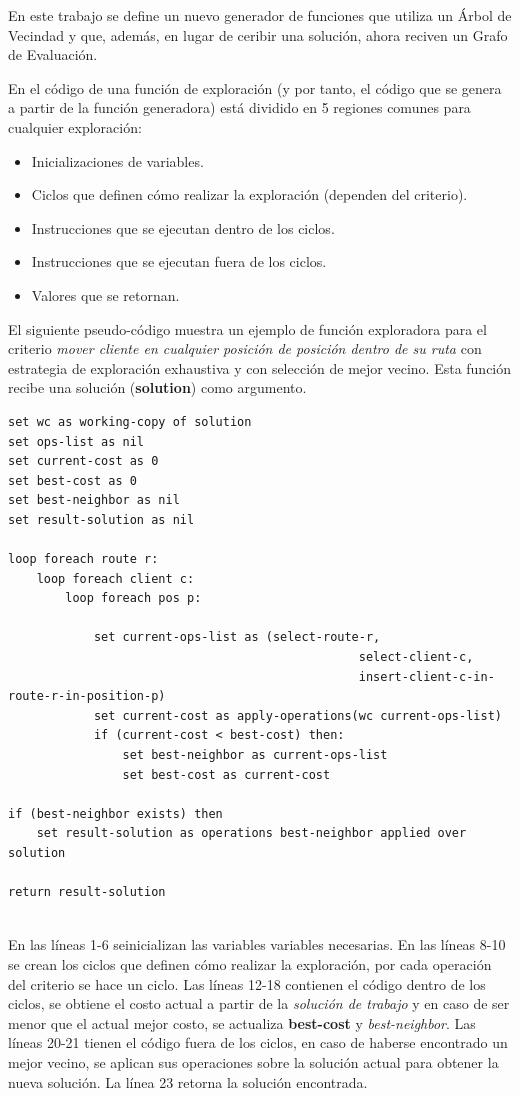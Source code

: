En este trabajo se define un nuevo generador de funciones que utiliza un Árbol de Vecindad y que, además, en lugar de ceribir una solución, ahora reciven un Grafo de Evaluación.

En \cite{Heidy} el código de una función de exploración (y por tanto, el código que se genera a partir de la función generadora) está dividido en 5 regiones comunes para cualquier exploración:

\begin{itemize}
	\item Inicializaciones de variables.
	\item Ciclos que definen cómo realizar la exploración (dependen del criterio).
	\item Instrucciones que se ejecutan dentro de los ciclos.
	\item Instrucciones que se ejecutan fuera de los ciclos.
	\item Valores que se retornan.
\end{itemize}

El siguiente pseudo-código muestra un ejemplo de función exploradora para el criterio \textit{mover cliente en cualquier posición de posición dentro de su ruta} con estrategia de exploración exhaustiva y con selección de mejor vecino. Esta función recibe una solución (\textbf{solution}) como argumento.

\begin{lstlisting}
set wc as working-copy of solution
set ops-list as nil
set current-cost as 0
set best-cost as 0
set best-neighbor as nil
set result-solution as nil

loop foreach route r:
	loop foreach client c:
		loop foreach pos p:
			
			set current-ops-list as (select-route-r,
												 select-client-c,
												 insert-client-c-in-route-r-in-position-p)
			set current-cost as apply-operations(wc current-ops-list)
			if (current-cost < best-cost) then:
				set best-neighbor as current-ops-list
				set best-cost as current-cost
				
if (best-neighbor exists) then
	set result-solution as operations best-neighbor applied over solution
	
return result-solution


\end{lstlisting}

En las líneas 1-6 seinicializan las variables variables necesarias. En las líneas 8-10 se crean los ciclos que definen cómo realizar la exploración, por cada operación del criterio se hace un ciclo. Las líneas 12-18 contienen el código dentro de los ciclos, se obtiene el costo actual a partir de la \textit{solución de trabajo} y en caso de ser menor que el actual mejor costo, se actualiza \textbf{best-cost} y \textit{best-neighbor}. Las líneas 20-21 tienen el código fuera de los ciclos, en caso de haberse encontrado un mejor vecino, se aplican sus operaciones sobre la solución actual para obtener la nueva solución. La línea 23 retorna la solución encontrada.

